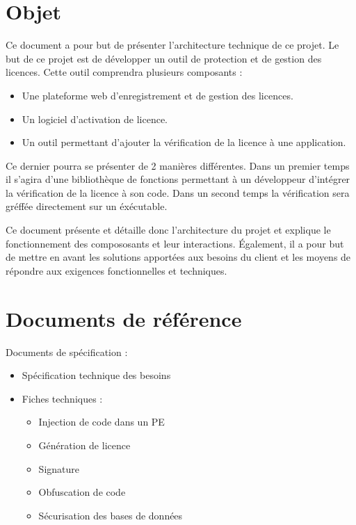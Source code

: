 \chapter{Objet}

Ce document a pour but de présenter l'architecture technique de ce projet. Le but de ce projet est de développer un outil de protection et de gestion des licences.
Cette outil comprendra plusieurs composants :
\begin{itemize}
    \item Une plateforme web d'enregistrement et de gestion des licences.
    \item Un logiciel d'activation de licence.
    \item Un outil permettant d'ajouter la vérification de la licence à une application.
\end{itemize}
Ce dernier pourra se présenter de 2 manières différentes.
Dans un premier temps il s'agira d'une bibliothèque de fonctions permettant à un développeur d'intégrer
la vérification de la licence à son code.
Dans un second temps la vérification sera gréffée directement sur un éxécutable.\newline

Ce document présente et détaille donc l'architecture du projet et explique le fonctionnement des compososants et leur interactions.
Également, il a pour but de mettre en avant les solutions apportées aux besoins du client et les moyens de répondre aux exigences
fonctionnelles et techniques.

\chapter{Documents de référence}

Documents de spécification :

\begin{itemize}
    \item Spécification technique des besoins
    \item Fiches techniques :
	\begin{itemize}
	    \item Injection de code dans un PE
	    \item Génération de licence
	    \item Signature
	    \item Obfuscation de code
	    \item Sécurisation des bases de données
	\end{itemize}
\end{itemize}

